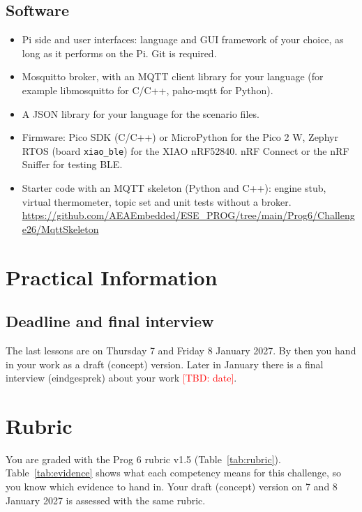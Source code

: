 \documentclass[11pt,a4paper]{article}
\newcommand{\tbd}[1]{\textcolor{red}{[TBD: #1]}}
\begin{document}
\subsection*{Software}
\begin{itemize}
  \item Pi side and user interfaces: language and GUI framework of your choice,
        as long as it performs on the Pi. Git is required.
  \item Mosquitto broker, with an MQTT client library for your language
        (for example libmosquitto for C/C++, paho-mqtt for Python).
  \item A JSON library for your language for the scenario files.
  \item Firmware: Pico SDK (C/C++) or MicroPython for the Pico 2 W, Zephyr
        RTOS (board \texttt{xiao\_ble}) for the XIAO nRF52840. nRF Connect or
        the nRF Sniffer for testing BLE.
  \item Starter code with an MQTT skeleton (Python and C++): engine stub,
        virtual thermometer, topic set and unit tests without a broker.\\
        \url{https://github.com/AEAEmbedded/ESE_PROG/tree/main/Prog6/Challenge26/MqttSkeleton}
\end{itemize}

\section{Practical Information}
\subsection*{Deadline and final interview}
The last lessons are on Thursday 7 and Friday 8 January 2027. By then you hand
in your work as a draft (concept) version. Later in January there is a final
interview (eindgesprek) about your work \tbd{date}.

\section{Rubric}
You are graded with the Prog 6 rubric v1.5 (Table~\ref{tab:rubric}).
Table~\ref{tab:evidence} shows what each competency means for this challenge,
so you know which evidence to hand in. Your draft (concept) version on 7 and
8 January 2027 is assessed with the same rubric.
\end{document}
